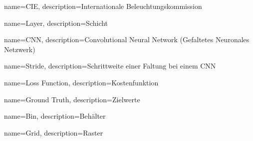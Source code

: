 {
	name=CIE,
	description={Internationale Beleuchtungskommission}
}

{
	name=Layer,
	description={Schicht}
}

{
	name=CNN,
	description={Convolutional Neural Network (Gefaltetes Neuronales Netzwerk)}
}

{
	name=Stride,
	description={Schrittweite einer Faltung bei einem \gls{CNN}}
}

{
	name=Loss Function,
	description={Kostenfunktion}
}

{
	name=Ground Truth,
	description={Zielwerte}
}

{
	name=Bin,
	description={Behälter}
}

{
	name=Grid,
	description={Raster}
}
